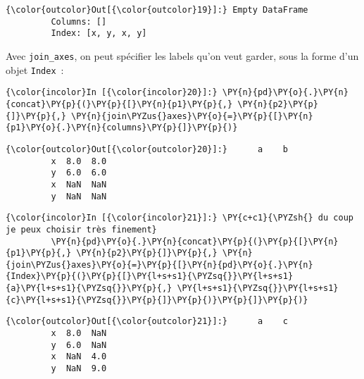 \begin{Verbatim}[commandchars=\\\{\},frame=single,framerule=0.3mm,rulecolor=\color{cellframecolor}]
{\color{outcolor}Out[{\color{outcolor}19}]:} Empty DataFrame
         Columns: []
         Index: [x, y, x, y]
\end{Verbatim}
            
    Avec \texttt{join\_axes}, on peut spécifier les labels qu'on veut
garder, sous la forme d'un objet \texttt{Index}~:

    \begin{Verbatim}[commandchars=\\\{\},frame=single,framerule=0.3mm,rulecolor=\color{cellframecolor}]
{\color{incolor}In [{\color{incolor}20}]:} \PY{n}{pd}\PY{o}{.}\PY{n}{concat}\PY{p}{(}\PY{p}{[}\PY{n}{p1}\PY{p}{,} \PY{n}{p2}\PY{p}{]}\PY{p}{,} \PY{n}{join\PYZus{}axes}\PY{o}{=}\PY{p}{[}\PY{n}{p1}\PY{o}{.}\PY{n}{columns}\PY{p}{]}\PY{p}{)}
\end{Verbatim}


\begin{Verbatim}[commandchars=\\\{\},frame=single,framerule=0.3mm,rulecolor=\color{cellframecolor}]
{\color{outcolor}Out[{\color{outcolor}20}]:}      a    b
         x  8.0  8.0
         y  6.0  6.0
         x  NaN  NaN
         y  NaN  NaN
\end{Verbatim}
            
    \begin{Verbatim}[commandchars=\\\{\},frame=single,framerule=0.3mm,rulecolor=\color{cellframecolor}]
{\color{incolor}In [{\color{incolor}21}]:} \PY{c+c1}{\PYZsh{} du coup je peux choisir très finement}
         \PY{n}{pd}\PY{o}{.}\PY{n}{concat}\PY{p}{(}\PY{p}{[}\PY{n}{p1}\PY{p}{,} \PY{n}{p2}\PY{p}{]}\PY{p}{,} \PY{n}{join\PYZus{}axes}\PY{o}{=}\PY{p}{[}\PY{n}{pd}\PY{o}{.}\PY{n}{Index}\PY{p}{(}\PY{p}{[}\PY{l+s+s1}{\PYZsq{}}\PY{l+s+s1}{a}\PY{l+s+s1}{\PYZsq{}}\PY{p}{,} \PY{l+s+s1}{\PYZsq{}}\PY{l+s+s1}{c}\PY{l+s+s1}{\PYZsq{}}\PY{p}{]}\PY{p}{)}\PY{p}{]}\PY{p}{)}
\end{Verbatim}


\begin{Verbatim}[commandchars=\\\{\},frame=single,framerule=0.3mm,rulecolor=\color{cellframecolor}]
{\color{outcolor}Out[{\color{outcolor}21}]:}      a    c
         x  8.0  NaN
         y  6.0  NaN
         x  NaN  4.0
         y  NaN  9.0
\end{Verbatim}
            
